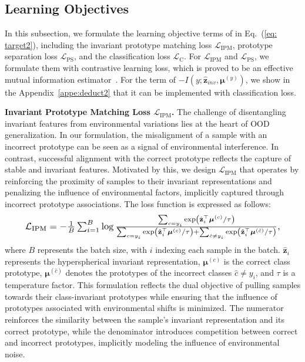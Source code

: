 \subsection{\ourmethod Learning Objectives} \label{subsec:objective}

In this subsection, we formulate the learning objective terms of \ourmethod in Eq.~(\ref{eq: target2}), including the invariant prototype matching loss $\mathcal{L}_{\mathrm{IPM}}$, prototype separation loss $\mathcal{L}_{\mathrm{PS}}$, and the classification loss $\mathcal{L}_{\mathrm{C}}$. For $\mathcal{L}_{\mathrm{IPM}}$ and $\mathcal{L}_{\mathrm{PS}}$, we formulate them with contrastive learning loss, which is proved to be an effective mutual information estimator~\citep{sordoni2021decomposed,xie2022self,sun2024interdependence}. For the term of $-I(y;\hat{\mathbf{z}}_{inv},\boldsymbol{\mu}^{(y)})$, we show in the Appendix~\ref{appe:deduct2} that it can be implemented with classification loss.

\noindent\textbf{Invariant Prototype Matching Loss $\mathcal{L}_{\mathrm{IPM}}$.}
The challenge of disentangling invariant features from environmental variations lies at the heart of OOD generalization. In our formulation, the misalignment of a sample with an incorrect prototype can be seen as {a signal of environmental interference.} In contrast, successful alignment with the correct prototype reflects {the capture of stable and invariant features.} Motivated by this, we design $\mathcal{L}_{\mathrm{IPM}}$ that operates by reinforcing the proximity of samples to their invariant representations and penalizing the influence of environmental factors, implicitly captured through incorrect prototype associations.
The loss function is expressed as follows:
\begin{align}\label{ipm}\resizebox{.9\hsize}{!}{$ \mathcal{L}_{\mathrm{IPM}} = - \frac{1}{B} \sum_{i=1}^{B} \log \frac{\sum_{c=y_i} \exp \left( \hat{\mathbf{z}}_i^\top \boldsymbol{\mu}^{(c)} / \tau \right)}{\sum_{c=y_i} \exp \left( \hat{\mathbf{z}}_i^\top \boldsymbol{\mu}^{(c)} / \tau \right) + \sum_{\hat{c} \neq y_i} \exp \left( \hat{\mathbf{z}}_i^\top \boldsymbol{\mu}^{(\hat{c})} / \tau \right)},$}
\end{align}
where $B$ represents the batch size, with $i$ indexing each sample in the batch. $\hat{\mathbf{z}}_i$ represents the hyperspherical invariant representation, $\boldsymbol{\mu}^{(c)}$ is the correct class prototype, $\boldsymbol{\mu}^{(\hat{c})}$ denotes the prototypes of the incorrect classes $\hat{c} \neq y_i$, and $\tau$ is a temperature factor. This formulation reflects the dual objective of pulling samples towards their class-invariant prototypes while ensuring that the influence of prototypes associated with environmental shifts is minimized. The numerator reinforces the similarity between the sample’s invariant representation and its correct prototype, while the denominator introduces competition between correct and incorrect prototypes, implicitly modeling the influence of environmental noise.

